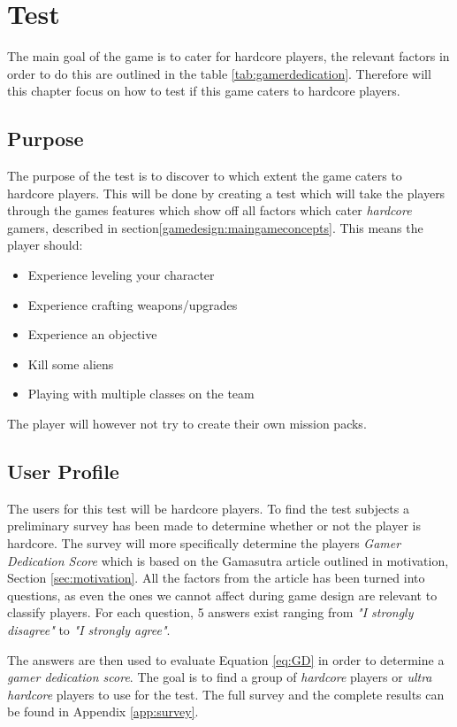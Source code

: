 \chapter{Test}
The main goal of the game is to cater for hardcore players, the relevant factors in order to do this are outlined in the table \ref{tab:gamerdedication}.
Therefore will this chapter focus on how to test if this game caters to hardcore players.

\section{Purpose}
The purpose of the test is to discover to which extent the game caters to hardcore players.
This will be done by creating a test which will take the players through the games features which show off all factors which cater \emph{hardcore} gamers, described in section\ref{gamedesign:maingameconcepts}.
This means the player should:
\begin{itemize}
	\item Experience leveling your character
	\item Experience crafting weapons/upgrades
	\item Experience an objective
	\item Kill some aliens
	\item Playing with multiple classes on the team
\end{itemize}
The player will however not try to create their own mission packs.

\section{User Profile}
The users for this test will be hardcore players.
To find the test subjects a preliminary survey has been made to determine whether or not the player is hardcore.
The survey will more specifically determine the players \textit{Gamer Dedication Score} which is based on the Gamasutra article\cite{casual_vs_hardcore} outlined in motivation, Section \ref{sec:motivation}.
All the factors from the article has been turned into questions, as even the ones we cannot affect during game design are relevant to classify players.
For each question, 5 answers exist ranging from \textit{"I strongly disagree"} to \textit{"I strongly agree"}.

The answers are then used to evaluate Equation \ref{eq:GD} in order to determine a \emph{gamer dedication score}.
The goal is to find a group of \emph{hardcore} players or \emph{ultra hardcore} players to use for the test.
The full survey and the complete results can be found in Appendix \ref{app:survey}.

